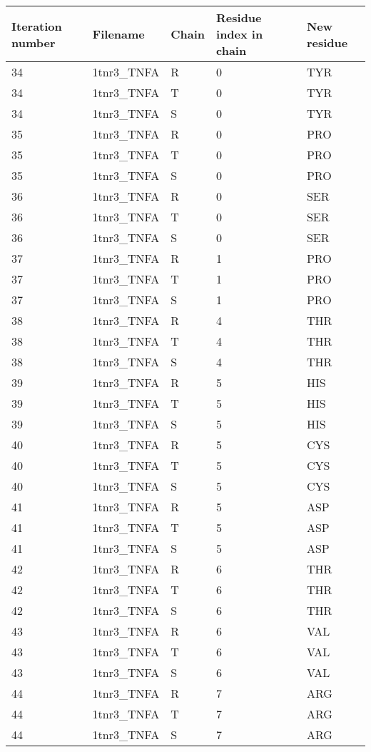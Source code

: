 \begin{longtable}[l]{l|l|l|l|l}
	Iteration number & Filename & Chain & Residue index in chain & New residue\\ \hline
	34 & 1tnr3_TNFA & R & 0 & TYR \\
	34 & 1tnr3_TNFA & T & 0 & TYR \\
	34 & 1tnr3_TNFA & S & 0 & TYR \\
	35 & 1tnr3_TNFA & R & 0 & PRO \\
	35 & 1tnr3_TNFA & T & 0 & PRO \\
	35 & 1tnr3_TNFA & S & 0 & PRO \\
	36 & 1tnr3_TNFA & R & 0 & SER \\
	36 & 1tnr3_TNFA & T & 0 & SER \\
	36 & 1tnr3_TNFA & S & 0 & SER \\
	37 & 1tnr3_TNFA & R & 1 & PRO \\
	37 & 1tnr3_TNFA & T & 1 & PRO \\
	37 & 1tnr3_TNFA & S & 1 & PRO \\
	38 & 1tnr3_TNFA & R & 4 & THR \\
	38 & 1tnr3_TNFA & T & 4 & THR \\
	38 & 1tnr3_TNFA & S & 4 & THR \\
	39 & 1tnr3_TNFA & R & 5 & HIS \\
	39 & 1tnr3_TNFA & T & 5 & HIS \\
	39 & 1tnr3_TNFA & S & 5 & HIS \\
	40 & 1tnr3_TNFA & R & 5 & CYS \\
	40 & 1tnr3_TNFA & T & 5 & CYS \\
	40 & 1tnr3_TNFA & S & 5 & CYS \\
	41 & 1tnr3_TNFA & R & 5 & ASP \\
	41 & 1tnr3_TNFA & T & 5 & ASP \\
	41 & 1tnr3_TNFA & S & 5 & ASP \\
	42 & 1tnr3_TNFA & R & 6 & THR \\
	42 & 1tnr3_TNFA & T & 6 & THR \\
	42 & 1tnr3_TNFA & S & 6 & THR \\
	43 & 1tnr3_TNFA & R & 6 & VAL \\
	43 & 1tnr3_TNFA & T & 6 & VAL \\
	43 & 1tnr3_TNFA & S & 6 & VAL \\
	44 & 1tnr3_TNFA & R & 7 & ARG \\
	44 & 1tnr3_TNFA & T & 7 & ARG \\
	44 & 1tnr3_TNFA & S & 7 & ARG \\

\end{longtable}
